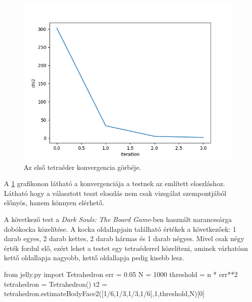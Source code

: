 \begin{figure}[h!]
	\centering
	\includegraphics[scale=0.7]{images/tetrahedron_01.png}
	\caption{Az első tetraéder konvergencia görbéje.}
	\label{fig:tetra01}
\end{figure}

A \ref{fig:tetra01} grafikonon látható a konvergenciája a testnek az említett eloszláshoz.
Látható hogy a választott teszt eloszlás nem csak vizsgálat szempontjából előnyös, hanem könnyen elérhető.

A következő test a \textit{Dark Souls: The Board Game}-ben használt narancssárga dobókocka közelítése.
A kocka oldallapjain található értékek a következőek: 1 darab egyes, 2 darab kettes, 2 darab hármas és 1 darab négyes.
Mivel csak négy érték fordul elő, ezért lehet a testet egy tetraéderrel közelíteni, aminek várhatóan kettő oldallapja nagyobb, kettő oldallapja pedig kisebb lesz.

\begin{python}
from jelly.py import Tetrahedron
err = 0.05
N = 1000
threshold = n * err**2
tetrahedron = Tetrahedron()
t2 = tetrahedron.estimateBodyFace2([1/6,1/3,1/3,1/6],1,threshold,N)[0]
\end{python}

